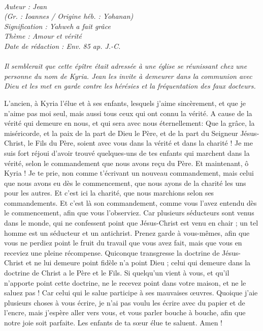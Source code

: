 \BFont
\noindent\hrulefill
{\footnotesize
\textit{
\bigskip
{\centering{}
\\Auteur : Jean
\\(Gr. : Ioannes / Origine héb. : Yohanan)
\\Signification : Yahweh a fait grâce
\\Thème : Amour et vérité
\\Date de rédaction : Env. 85 ap. J.-C.\\}
}
\textit{
\\Il semblerait que cette épître était adressée à une église se réunissant chez une personne du nom de Kyria. Jean les invite à demeurer dans la communion avec Dieu et les met en garde contre les hérésies et la fréquentation des faux docteurs.\bigskip
}
}
\par\nobreak\noindent\hrulefill
\begin{multicols}{2}
\VerseOne{}L'ancien, à Kyria l'élue et à ses enfants, lesquels j'aime sincèrement, et que je n'aime pas moi seul, mais aussi tous ceux qui ont connu la vérité.
A cause de la vérité qui demeure en nous, et qui sera avec nous éternellement:
Que la grâce, la miséricorde, et la paix de la part de Dieu le Père, et de la part du Seigneur Jésus-Christ, le Fils du Père, soient avec vous dans la vérité et dans la charité !
Je me suis fort réjoui d'avoir trouvé quelques-uns de tes enfants qui marchent dans la vérité, selon le commandement que nous avons reçu du Père.
Et maintenant, ô Kyria ! Je te prie, non comme t'écrivant un nouveau commandement, mais celui que nous avons eu dès le commencement, que nous ayons de la charité les uns pour les autres.
Et c'est ici la charité, que nous marchions selon ses commandements. Et c'est là son commandement, comme vous l'avez entendu dès le commencement, afin que vous l'observiez.
Car plusieurs séducteurs sont venus dans le monde, qui ne confessent point que Jésus-Christ est venu en chair ; un tel homme est un séducteur et un antichrist.
Prenez garde à vous-mêmes, afin que vous ne perdiez point le fruit du travail que vous avez fait, mais que vous en receviez une pleine récompense.
Quiconque transgresse la doctrine de Jésus-Christ et ne lui demeure point fidèle n'a point Dieu ; celui qui demeure dans la doctrine de Christ a le Père et le Fils.
Si quelqu'un vient à vous, et qu'il n'apporte point cette doctrine, ne le recevez point dans votre maison, et ne le saluez pas !
Car celui qui le salue participe à ses mauvaises œuvres.
Quoique j'aie plusieurs choses à vous écrire, je n'ai pas voulu les écrire avec du papier et de l'encre, mais j'espère aller vers vous, et vous parler bouche à bouche, afin que notre joie soit parfaite.
Les enfants de ta sœur élue te saluent. Amen !
\PPE{}
\end{multicols}
